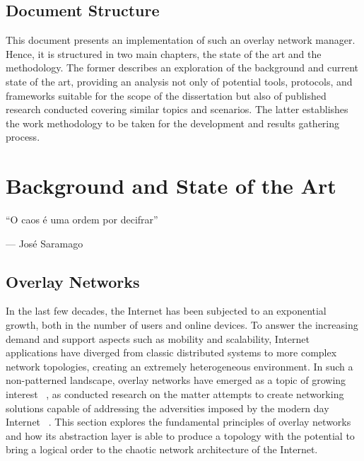 \documentclass[11pt,twoside,a4paper]{report}
\begin{document}
\section{Document Structure}

This document presents an implementation of such an overlay network manager. Hence, it is structured in two main chapters, the state of the art and the methodology. The former describes an exploration of the background and current state of the art, providing an analysis not only of potential tools, protocols, and frameworks suitable for the scope of the dissertation but also of published research conducted covering similar topics and scenarios. The latter establishes the work methodology to be taken for the development and results gathering process.


\cleardoublepage

\chapter{Background and State of the Art}
\label{chapter:sota}

\begin{minipage}{80mm}
     \centering %
     ``O caos é uma ordem por decifrar''
          \begin{flushright}
          --- José Saramago
          \end{flushright}
     \end{minipage}


\section{Overlay Networks}
\label{sec:on}

In the last few decades, the Internet has been subjected to an exponential growth, both in the number of users and online devices. To answer the increasing demand and support aspects such as mobility and scalability, Internet applications have diverged from classic distributed systems to more complex network topologies, creating an extremely heterogeneous environment. In such a non-patterned landscape, overlay networks have emerged as a topic of growing interest ~\cite{1610546}, as conducted research on the matter attempts to create networking solutions capable of addressing the adversities imposed by the modern day Internet ~\cite{jannotti2000overcast, waldvogel2003efficient}. This section explores the fundamental principles of overlay networks and how its abstraction layer is able to produce a topology with the potential to bring a logical order to  the chaotic network architecture of the Internet.
\end{document}
